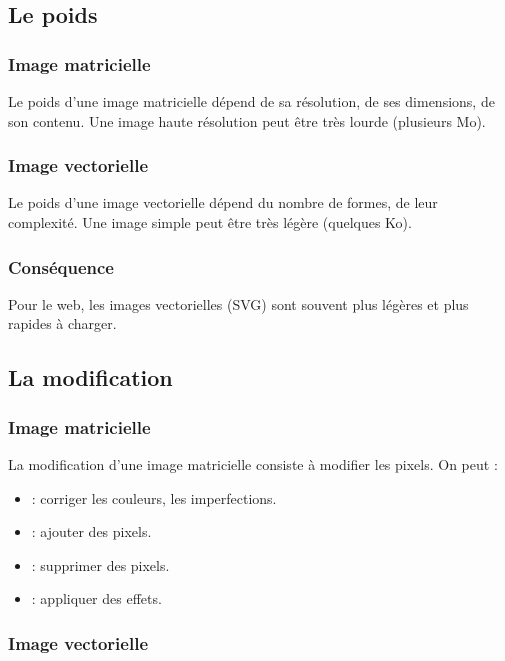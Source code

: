 \subsection{Le poids}

\subsubsection{Image matricielle}

Le poids d'une image matricielle dépend de sa résolution, de ses dimensions, de son contenu. Une image haute résolution peut être très lourde (plusieurs Mo).

\subsubsection{Image vectorielle}

Le poids d'une image vectorielle dépend du nombre de formes, de leur complexité. Une image simple peut être très légère (quelques Ko).

\subsubsection{Conséquence}

Pour le web, les images vectorielles (SVG) sont souvent plus légères et plus rapides à charger.

\subsection{La modification}

\subsubsection{Image matricielle}

La modification d'une image matricielle consiste à modifier les pixels. On peut :

\begin{itemize}
    \item {} : corriger les couleurs, les imperfections.
    \item {} : ajouter des pixels.
    \item {} : supprimer des pixels.
    \item {} : appliquer des effets.
\end{itemize}

\subsubsection{Image vectorielle}

